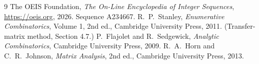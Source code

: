 \documentclass[11pt,a4paper]{article}
\theoremstyle{plain}
\theoremstyle{definition}
\begin{document}
\begin{thebibliography}{9}
 The OEIS Foundation, \emph{The On-Line Encyclopedia of Integer
Sequences}, \url{https://oeis.org}, 2026. Sequence A234667.
 R.~P.~Stanley, \emph{Enumerative Combinatorics}, Volume 1, 2nd ed.,
Cambridge University Press, 2011. (Transfer-matrix method, Section 4.7.)
 P.~Flajolet and R.~Sedgewick, \emph{Analytic Combinatorics}, Cambridge
University Press, 2009.
 R.~A.~Horn and C.~R.~Johnson, \emph{Matrix Analysis}, 2nd ed., Cambridge
University Press, 2013.
\end{thebibliography}
\end{document}
